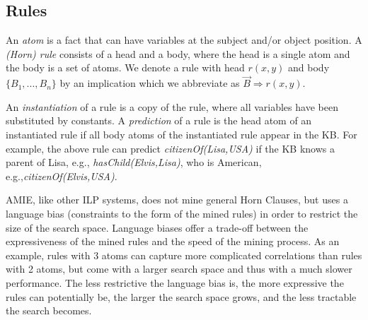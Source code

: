 \subsection{Rules}
\label{subsec:rules}

An \emph{atom} is a fact that can have variables at the subject and/or object position.
A \emph{(Horn) rule} consists of a head and a body, where the head is a single atom and the body is a set of atoms.
We denote a rule with head $r(x,y)$ and body $\{B_1,..., B_n\}$ by an implication
which we abbreviate as $\vec{B} \Rightarrow r(x,y)$.

An \emph{instantiation} of a rule is a copy of the rule, where all variables have been substituted by constants.
A \emph{prediction} of a rule is the head atom of an instantiated rule if all body atoms of the instantiated rule appear in the KB.
For example, the above rule can predict \emph{citizenOf(Lisa,USA)} if the KB knows a parent of Lisa, e.g.,
\emph{hasChild(Elvis,Lisa)}, who is American, e.g.,\emph{citizenOf(Elvis,USA)}.

AMIE, like other ILP systems, does not mine general Horn Clauses, but uses a language bias (constraints to the form of the mined rules) 
in order to restrict the size of the search space. 
Language biases offer a trade-off between the expressiveness of the mined rules and the speed of the mining process.
As an example, rules with 3 atoms can capture more complicated correlations than rules with 2 atoms, but come with a larger search space and thus with a much slower performance.
The less restrictive the language bias is,
the more expressive the rules can potentially be, the larger the search space grows, and the less tractable the search becomes.

